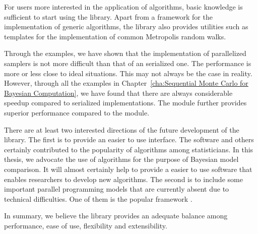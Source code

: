 For users more interested in the application of \smc algorithms, basic \cpp knowledge is sufficient to start using the library. Apart from a framework for the implementation of generic \smc algorithms, the library also provides utilities such as templates for the implementation of common Metropolis random walks.

Through the examples, we have shown that the implementation of parallelized samplers is not more difficult than that of an serialized one. The performance is more or less close to ideal situations. This may not always be the case in reality. However, through all the examples in Chapter~\ref{cha:Sequential Monte Carlo for Bayesian Computation}, we have found that there are always considerable speedup compared to serialized implementations. The \opencl module further provides superior performance compared to the \smc module.

There are at least two interested directions of the future development of the library. The first is to provide an easier to use interface. The \bugs software and others certainly contributed to the popularity of \mcmc algorithms among statisticians. In this thesis, we advocate the use of \smc algorithms for the purpose of Bayesian model comparison. It will almost certainly help to provide a easier to use software that enables researchers to develop new algorithms. The second is to include some important parallel programming models that are currently absent due to technical difficulties. One of them is the popular \cuda framework \cite{cuda}.

In summary, we believe the \vsmc library provides an adequate balance among performance, ease of use, flexibility and extensibility.
